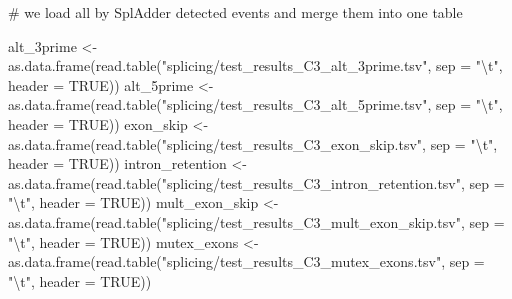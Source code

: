 \documentclass[
  letterpaper,
  DIV=11,
  numbers=noendperiod]{scrartcl}
\newenvironment{Shaded}{\begin{snugshade}}{\end{snugshade}}
\newcommand{\AttributeTok}[1]{\textcolor[rgb]{0.40,0.45,0.13}{#1}}
\newcommand{\CommentTok}[1]{\textcolor[rgb]{0.37,0.37,0.37}{#1}}
\newcommand{\ConstantTok}[1]{\textcolor[rgb]{0.56,0.35,0.01}{#1}}
\newcommand{\FunctionTok}[1]{\textcolor[rgb]{0.28,0.35,0.67}{#1}}
\newcommand{\NormalTok}[1]{\textcolor[rgb]{0.00,0.23,0.31}{#1}}
\newcommand{\OtherTok}[1]{\textcolor[rgb]{0.00,0.23,0.31}{#1}}
\newcommand{\SpecialCharTok}[1]{\textcolor[rgb]{0.37,0.37,0.37}{#1}}
\newcommand{\StringTok}[1]{\textcolor[rgb]{0.13,0.47,0.30}{#1}}
\begin{document}
\begin{Shaded}
\begin{Highlighting}[]
\CommentTok{\# we load all by SplAdder detected events and merge them into one table}

\NormalTok{alt\_3prime }\OtherTok{\textless{}{-}} \FunctionTok{as.data.frame}\NormalTok{(}\FunctionTok{read.table}\NormalTok{(}\StringTok{"splicing/test\_results\_C3\_alt\_3prime.tsv"}\NormalTok{, }\AttributeTok{sep =} \StringTok{"}\SpecialCharTok{\textbackslash{}t}\StringTok{"}\NormalTok{, }\AttributeTok{header =} \ConstantTok{TRUE}\NormalTok{))}
\NormalTok{alt\_5prime }\OtherTok{\textless{}{-}} \FunctionTok{as.data.frame}\NormalTok{(}\FunctionTok{read.table}\NormalTok{(}\StringTok{"splicing/test\_results\_C3\_alt\_5prime.tsv"}\NormalTok{, }\AttributeTok{sep =} \StringTok{"}\SpecialCharTok{\textbackslash{}t}\StringTok{"}\NormalTok{, }\AttributeTok{header =} \ConstantTok{TRUE}\NormalTok{))}
\NormalTok{exon\_skip }\OtherTok{\textless{}{-}} \FunctionTok{as.data.frame}\NormalTok{(}\FunctionTok{read.table}\NormalTok{(}\StringTok{"splicing/test\_results\_C3\_exon\_skip.tsv"}\NormalTok{, }\AttributeTok{sep =} \StringTok{"}\SpecialCharTok{\textbackslash{}t}\StringTok{"}\NormalTok{, }\AttributeTok{header =} \ConstantTok{TRUE}\NormalTok{))}
\NormalTok{intron\_retention }\OtherTok{\textless{}{-}} \FunctionTok{as.data.frame}\NormalTok{(}\FunctionTok{read.table}\NormalTok{(}\StringTok{"splicing/test\_results\_C3\_intron\_retention.tsv"}\NormalTok{, }\AttributeTok{sep =} \StringTok{"}\SpecialCharTok{\textbackslash{}t}\StringTok{"}\NormalTok{, }\AttributeTok{header =} \ConstantTok{TRUE}\NormalTok{))}
\NormalTok{mult\_exon\_skip }\OtherTok{\textless{}{-}} \FunctionTok{as.data.frame}\NormalTok{(}\FunctionTok{read.table}\NormalTok{(}\StringTok{"splicing/test\_results\_C3\_mult\_exon\_skip.tsv"}\NormalTok{, }\AttributeTok{sep =} \StringTok{"}\SpecialCharTok{\textbackslash{}t}\StringTok{"}\NormalTok{, }\AttributeTok{header =} \ConstantTok{TRUE}\NormalTok{))}
\NormalTok{mutex\_exons }\OtherTok{\textless{}{-}} \FunctionTok{as.data.frame}\NormalTok{(}\FunctionTok{read.table}\NormalTok{(}\StringTok{"splicing/test\_results\_C3\_mutex\_exons.tsv"}\NormalTok{, }\AttributeTok{sep =} \StringTok{"}\SpecialCharTok{\textbackslash{}t}\StringTok{"}\NormalTok{, }\AttributeTok{header =} \ConstantTok{TRUE}\NormalTok{))}



\end{Highlighting}
\end{Shaded}
\end{document}
